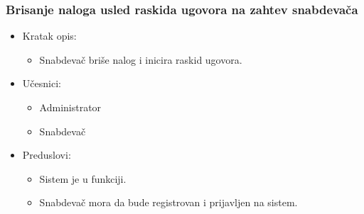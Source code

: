 \subsubsection{Brisanje naloga usled raskida ugovora na zahtev snabdevača}

\begin{itemize}
    \item Kratak opis:
        \begin{itemize}
            \item Snabdevač briše nalog i inicira raskid ugovora.
        \end{itemize}
    \item Učesnici:
        \begin{itemize}
            \item Administrator
            \item Snabdevač
        \end{itemize}
    \item Preduslovi:
        \begin{itemize}
          \item Sistem je u funkciji.
            \item Snabdevač mora da bude registrovan i prijavljen na sistem.
            

\end{itemize}
\end{itemize}
